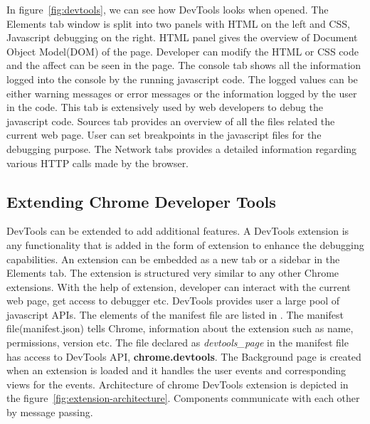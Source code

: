 In figure~\ref{fig:devtools}, we can see how DevTools looks when opened. The Elements tab window is split into two panels with HTML on the left and CSS, Javascript debugging on the right. HTML panel gives the overview of Document Object Model(DOM) of the page. Developer can modify the HTML or CSS code and the affect can be seen in the page. The console tab shows all the information logged into the console by the running javascript code. The logged values can be either warning messages or error messages or the information logged by the user in the code. This tab is extensively used by web developers to debug the javascript code. Sources tab provides an overview of all the files related the current web page. User can set breakpoints in the javascript files for the debugging purpose. The Network tabs provides a detailed information regarding various HTTP calls made by the browser. 

\subsection{Extending Chrome Developer Tools}
DevTools can be extended to add additional features. 
A DevTools extension is any functionality that is added in the form of extension to enhance the debugging capabilities. 
An extension can be embedded as a new tab or a sidebar in the Elements tab. 
The extension is structured very similar to any other Chrome extensions\cite{devtoolsextension}. 
With the help of extension, developer can interact with the current web page, get access to debugger etc. 
DevTools provides user a large pool of javascript APIs\cite{devtools}. 
The elements of the manifest file are listed in \cite{devtoolsmanifestfile}. 
The manifest file(manifest.json) tells Chrome, information about the extension such as name, permissions, version etc. 
The file declared as \textit{devtools\_page} in the manifest file has access to DevTools API, \textbf{chrome.devtools}. 
The Background page is created when an extension is loaded and it handles the user events and corresponding views for the events. 
Architecture of chrome DevTools extension is depicted in the figure~\ref{fig:extension-architecture}. 
Components communicate with each other by message passing.

